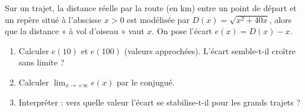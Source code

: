 \documentclass[11pt,a4paper]{article}
\begin{document}
\begin{exercice}
Sur un trajet, la distance réelle par la route (en km) entre un point de départ et un repère situé à
l'abscisse $x>0$ est modélisée par $D(x)=\sqrt{x^2+40x}$, alors que la distance « à vol d'oiseau »
vaut $x$. On pose l'écart $e(x)=D(x)-x$.
\begin{enumerate}[label=\alph*),leftmargin=2em,itemsep=3pt]
  \item Calculer $e(10)$ et $e(100)$ (valeurs approchées). L'écart semble-t-il croître sans limite ?
  \item Calculer $\displaystyle\lim_{x\to+\infty} e(x)$ par le conjugué.
  \item Interpréter : vers quelle valeur l'écart se stabilise-t-il pour les grands trajets ?
\end{enumerate}
\end{exercice}
\end{document}
